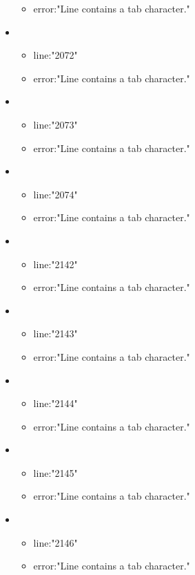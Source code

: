 \begin{itemize}
\begin{itemize}
		\item error:"Line contains a tab character." 
	\end{itemize}
	\item 
	\begin{itemize} 
		\item line:"2072" 
		\item error:"Line contains a tab character." 
	\end{itemize}
	\item 
	\begin{itemize} 
		\item line:"2073" 
		\item error:"Line contains a tab character." 
	\end{itemize}
	\item 
	\begin{itemize} 
		\item line:"2074" 
		\item error:"Line contains a tab character." 
	\end{itemize}
	\item 
	\begin{itemize} 
		\item line:"2142" 
		\item error:"Line contains a tab character." 
	\end{itemize}
	\item 
	\begin{itemize} 
		\item line:"2143" 
		\item error:"Line contains a tab character." 
	\end{itemize}
	\item 
	\begin{itemize} 
		\item line:"2144" 
		\item error:"Line contains a tab character." 
	\end{itemize}
	\item 
	\begin{itemize} 
		\item line:"2145" 
		\item error:"Line contains a tab character." 
	\end{itemize}
	\item 
	\begin{itemize} 
		\item line:"2146" 
		\item error:"Line contains a tab character." 
	\end{itemize}

\end{itemize}
